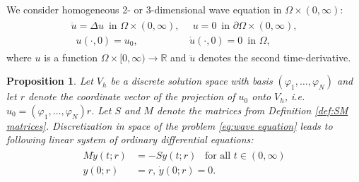 \documentclass[a4paper,11pt,bibliography=totoc,listof=totoc,headinclude=true,cleardoublepage=empty,oneside]{scrbook}
\newtheorem{prop}[theorem]{Proposition}
\newcommand{\R}{\mathbb{R}}
\begin{document}
We consider homogeneous 2- or 3-dimensional wave equation in $\Omega \times (0, \infty)$:
\begin{align}
\begin{split}\label{eq:wave equation}
    \ddot{u} = \Delta u \, \,\, \text{in } \Omega \times (0, \infty),& \, \,\,  u = 0 \, \,\, \text{in } \partial\Omega\times (0, \infty),\\
    \,\,\,u( \cdot, 0)= u_0, & \, \dot{u}(\cdot, 0) = 0 \, \,\, \text{in } \Omega,
\end{split}
\end{align}
where $u$ is a function $\Omega \times [0, \infty) \rightarrow \R$ and $\ddot{u}$ denotes the second time-derivative.
\begin{prop}
    Let $V_h$ be a discrete solution space with basis $(\varphi_1, \dots, \varphi_N)$ and let $r$ denote the coordinate vector of the projection of $u_0$ onto $V_h$, i.e. $u_0 = (\varphi_1, \dots, \varphi_N)r$. Let $S$ and $M$ denote the matrices from Definition \ref{def:SM matrices}. Discretization in space of the problem \eqref{eq:wave equation} leads to following linear system of ordinary differential equations:
    \begin{align}\label{eq:discr wave equation}
    \begin{split}
        M \ddot{y}(t; r) &= -S y (t; r) \,\,\, \text{ for all } t \in (0, \infty) \\
        y(0; r) &= r, \, \dot{y}(0; r) = 0. 
    \end{split}
    \end{align}
\end{prop}
\end{document}
